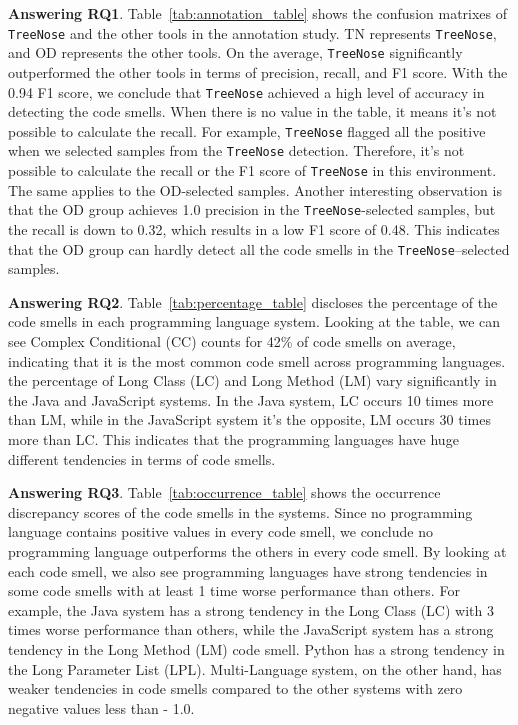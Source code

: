 


{\bf Answering RQ1}. Table~\ref{tab:annotation_table} shows the confusion
matrixes of \texttt{TreeNose} and the other tools in the annotation study. TN
represents \texttt{TreeNose}, and OD represents the other tools. On the
average, \texttt{TreeNose} significantly outperformed the other tools in terms
of precision, recall, and F1 score. With the 0.94 F1 score, we conclude that
\texttt{TreeNose} achieved a high level of accuracy in detecting the code
smells. When there is no value in the table, it means it's not possible to
calculate the recall. For example, \texttt{TreeNose} flagged all the positive
when we selected samples from the \texttt{TreeNose} detection. Therefore, it's
not possible to calculate the recall or the F1 score of \texttt{TreeNose} in
this environment. The same applies to the OD-selected samples. Another
interesting observation is that the OD group achieves 1.0 precision in the
\texttt{TreeNose}-selected samples, but the recall is down to 0.32, which
results in a low F1 score of 0.48. This indicates that the OD group can hardly
detect all the code smells in the \texttt{TreeNose}--selected samples.

{\bf Answering RQ2}. Table~\ref{tab:percentage_table} discloses the percentage
of the code smells in each programming language system. Looking at the table,
we can see Complex Conditional (CC) counts for 42\% of code smells on average,
indicating that it is the most common code smell across programming languages.
the percentage of Long Class (LC) and Long Method (LM) vary significantly in
the Java and JavaScript systems. In the Java system, LC occurs 10 times more
than LM, while in the JavaScript system it's the opposite, LM occurs 30 times
more than LC. This indicates that the programming languages have huge different
tendencies in terms of code smells.


{\bf Answering RQ3}. Table~\ref{tab:occurrence_table} shows the occurrence
discrepancy scores of the code smells in the systems. Since no programming
language contains positive values in every code smell, we conclude no
programming language outperforms the others in every code smell. By looking at
each code smell, we also see programming languages have strong tendencies in
some code smells with at least 1 time worse performance than others. For
example, the Java system has a strong tendency in the Long Class (LC) with 3
times worse performance than others, while the JavaScript system has a strong
tendency in the Long Method (LM) code smell. Python has a strong tendency in
the Long Parameter List (LPL). Multi-Language system, on the other hand, has
weaker tendencies in code smells compared to the other systems with zero
negative values less than - 1.0.
